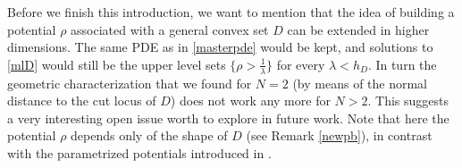 \documentclass[reqno,11pt]{amsart}
\theoremstyle{definition}
\numberwithin{equation}{section}
\newcommand{\1}{{{\bf 1}\kern-0,28em\rm l}}
\def\l{\lambda}
\begin{document}
\medskip

Before we finish this introduction, we want to mention   that the  idea of building a potential $\rho$ associated with a general convex set $D$ can  be  extended in higher dimensions. The same PDE as in \eqref{masterpde} would be kept, and solutions to \eqref{mlD} would still be the upper level sets $\{\rho> \frac1{\l}\}$ for every $\l<h_D$. In turn the geometric characterization that we found for $N=2$ (by means of the normal distance to the cut locus of $D$) does not work any more for $N>2$. This suggests a very interesting open issue worth to explore in future work.
 Note that here the potential $\rho$  depends only of the shape of $D$ (see Remark \ref{newpb}), in contrast with the parametrized potentials introduced in \cite{alter2005characterization}. 
\end{document}
